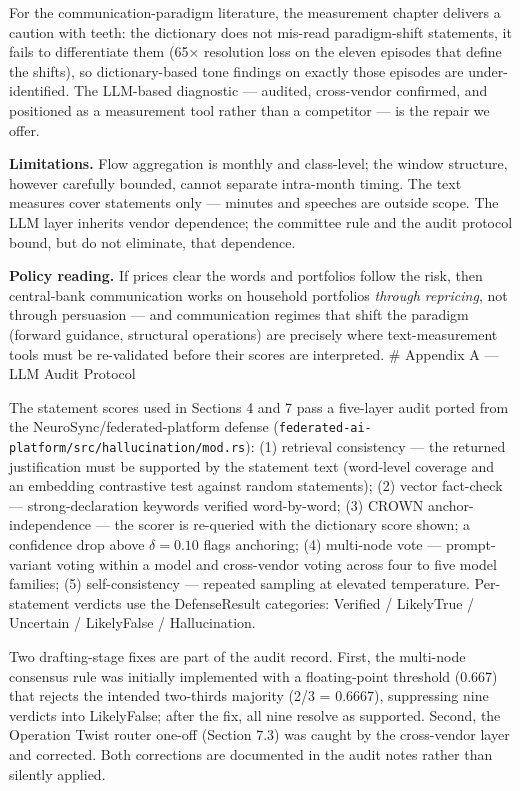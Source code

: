 For the communication-paradigm literature, the measurement chapter delivers a caution with teeth: the dictionary does not mis-read paradigm-shift statements, it fails to differentiate them (65× resolution loss on the eleven episodes that define the shifts), so dictionary-based tone findings on exactly those episodes are under-identified. The LLM-based diagnostic --- audited, cross-vendor confirmed, and positioned as a measurement tool rather than a competitor --- is the repair we offer.

\textbf{Limitations.} Flow aggregation is monthly and class-level; the window structure, however carefully bounded, cannot separate intra-month timing. The text measures cover statements only --- minutes and speeches are outside scope. The LLM layer inherits vendor dependence; the committee rule and the audit protocol bound, but do not eliminate, that dependence.

\textbf{Policy reading.} If prices clear the words and portfolios follow the risk, then central-bank communication works on household portfolios \emph{through repricing}, not through persuasion --- and communication regimes that shift the paradigm (forward guidance, structural operations) are precisely where text-measurement tools must be re-validated before their scores are interpreted. \# Appendix A --- LLM Audit Protocol

The statement scores used in Sections 4 and 7 pass a five-layer audit ported from the NeuroSync/federated-platform defense (\texttt{federated-ai-platform/src/hallucination/mod.rs}): (1) retrieval consistency --- the returned justification must be supported by the statement text (word-level coverage and an embedding contrastive test against random statements); (2) vector fact-check --- strong-declaration keywords verified word-by-word; (3) CROWN anchor-independence --- the scorer is re-queried with the dictionary score shown; a confidence drop above \(\delta = 0.10\) flags anchoring; (4) multi-node vote --- prompt-variant voting within a model and cross-vendor voting across four to five model families; (5) self-consistency --- repeated sampling at elevated temperature. Per-statement verdicts use the DefenseResult categories: Verified / LikelyTrue / Uncertain / LikelyFalse / Hallucination.





Two drafting-stage fixes are part of the audit record. First, the multi-node consensus rule was initially implemented with a floating-point threshold (0.667) that rejects the intended two-thirds majority (2/3 = 0.6667), suppressing nine verdicts into LikelyFalse; after the fix, all nine resolve as supported. Second, the Operation Twist router one-off (Section 7.3) was caught by the cross-vendor layer and corrected. Both corrections are documented in the audit notes rather than silently applied.

